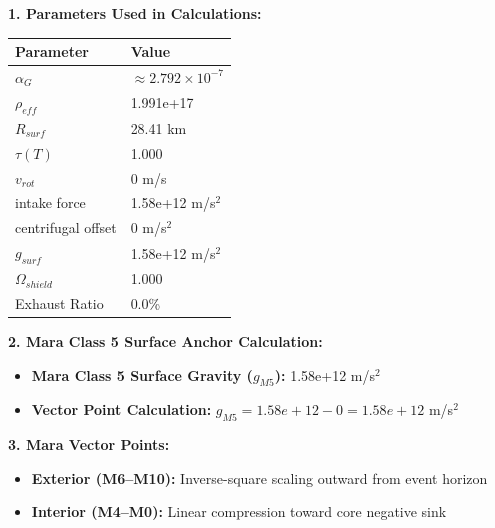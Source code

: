 \documentclass[11pt, a4paper]{article}
\begin{document}
\vspace{0.5em}
\noindent \textbf{1. Parameters Used in Calculations:}
\begin{center}
  \begin{tabular}{|l|l|}
    \hline
    \textbf{Parameter} & \textbf{Value} \\ \hline
    $\alpha_G$ & $\approx 2.792 \times 10^{-7}$ \\ \hline
    $\rho_{eff}$ & 1.991e+17 \\ \hline
    $R_{surf}$ & 28.41 km \\ \hline
    $\tau(T)$ & 1.000 \\ \hline
    $v_{rot}$ & 0 m/s \\ \hline
    intake force & 1.58e+12 m/s$^2$ \\ \hline
    centrifugal offset & 0 m/s$^2$ \\ \hline
    $g_{surf}$ & 1.58e+12 m/s$^2$ \\ \hline
    $\Omega_{shield}$ & 1.000 \\ \hline
    Exhaust Ratio & 0.0\% \\ \hline
  \end{tabular}
\end{center}

\vspace{0.5em}
\noindent \textbf{2. Mara Class 5 Surface Anchor Calculation:}
\begin{itemize}
  \item \textbf{Mara Class 5 Surface Gravity ($g_{M5}$):} 1.58e+12 m/s$^2$
  \item \textbf{Vector Point Calculation:} $g_{M5} = 1.58e+12 - 0 = 1.58e+12$ m/s$^2$
\end{itemize}

\vspace{0.5em}
\noindent \textbf{3. Mara Vector Points:}
\begin{itemize}
  \item \textbf{Exterior (M6--M10):} Inverse-square scaling outward from event horizon
  \item \textbf{Interior (M4--M0):} Linear compression toward core negative sink
\end{itemize}
\end{document}
